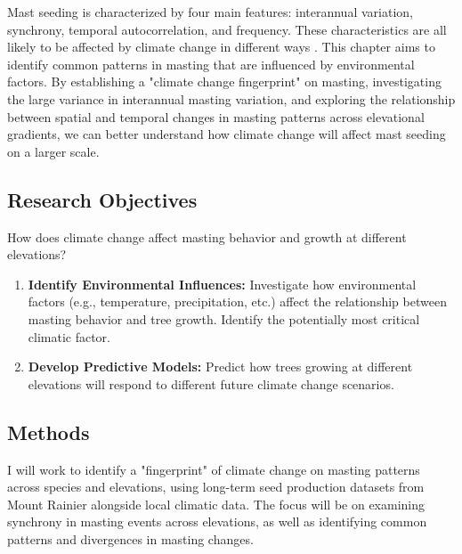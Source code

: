 \documentclass[11pt,letter]{article}
\begin{document}
Mast seeding is characterized by four main features: interannual variation, synchrony, temporal autocorrelation, and frequency. These characteristics are all likely to be affected by climate change in different ways \citep{hacket2021climate}. This chapter aims to identify common patterns in masting that are influenced by environmental factors. By establishing a "climate change fingerprint" on masting, investigating the large variance in interannual masting variation, and exploring the relationship between spatial and temporal changes in masting patterns across elevational gradients, we can better understand how climate change will affect mast seeding on a larger scale.


\subsection{Research Objectives}
How does climate change affect masting behavior and growth at different elevations? %
	\begin{enumerate}
\item \textbf{Identify Environmental Influences:} Investigate how environmental factors (e.g., temperature, precipitation, etc.) affect the relationship between masting behavior and tree growth. Identify the potentially most critical climatic factor.	
\item \textbf{Develop Predictive Models:} Predict how trees growing at different elevations will respond to different future climate change scenarios.	%
	\end{enumerate}
\subsection{Methods}
I will work to identify a "fingerprint" of climate change on masting patterns across species and elevations, using long-term seed production datasets from Mount Rainier alongside local climatic data. The focus will be on examining synchrony in masting events across elevations, as well as identifying common patterns and divergences in masting changes.
\end{document}

